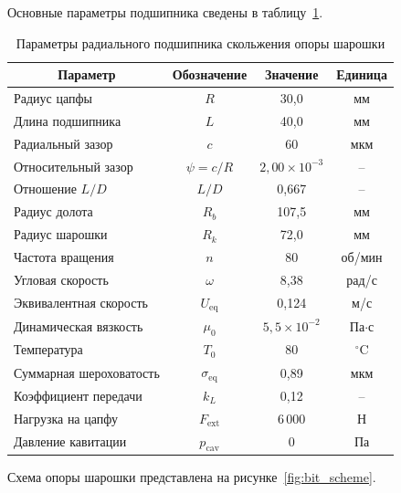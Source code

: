 Основные параметры подшипника сведены в таблицу~\ref{tab:bit_params}.

\begin{table}[!ht]
\centering
\caption{Параметры радиального подшипника скольжения опоры шарошки}
\label{tab:bit_params}
\begin{tabularx}{\textwidth}{|X|c|c|c|}
\hline
\multicolumn{1}{|c|}{\textbf{Параметр}} & \textbf{Обозначение} & \textbf{Значение} & \textbf{Единица} \\
\hline
Радиус цапфы              & $R$              & 30{,}0  & мм \\
\hline
Длина подшипника          & $L$              & 40{,}0  & мм \\
\hline
Радиальный зазор          & $c$              & 60      & мкм \\
\hline
Относительный зазор       & $\psi = c/R$     & $2{,}00 \times 10^{-3}$ & -- \\
\hline
Отношение $L/D$           & $L/D$            & 0{,}667 & -- \\
\hline
Радиус долота             & $R_b$            & 107{,}5 & мм \\
\hline
Радиус шарошки            & $R_k$            & 72{,}0  & мм \\
\hline
Частота вращения          & $n$              & 80      & об/мин \\
\hline
Угловая скорость          & $\omega$         & 8{,}38  & рад/с \\
\hline
Эквивалентная скорость    & $U_{\mathrm{eq}}$ & 0{,}124 & м/с \\
\hline
Динамическая вязкость     & $\mu_0$          & $5{,}5 \times 10^{-2}$ & Па$\cdot$с \\
\hline
Температура               & $T_0$            & 80      & $^{\circ}$C \\
\hline
Суммарная шероховатость   & $\sigma_{\mathrm{eq}}$ & 0{,}89 & мкм \\
\hline
Коэффициент передачи      & $k_L$            & 0{,}12  & -- \\
\hline
Нагрузка на цапфу         & $F_{\mathrm{ext}}$ & 6\,000 & Н \\
\hline
Давление кавитации        & $p_{\mathrm{cav}}$ & 0     & Па \\
\hline
\end{tabularx}
\end{table}

\FloatBarrier

Схема опоры шарошки представлена на рисунке~\ref{fig:bit_scheme}.

